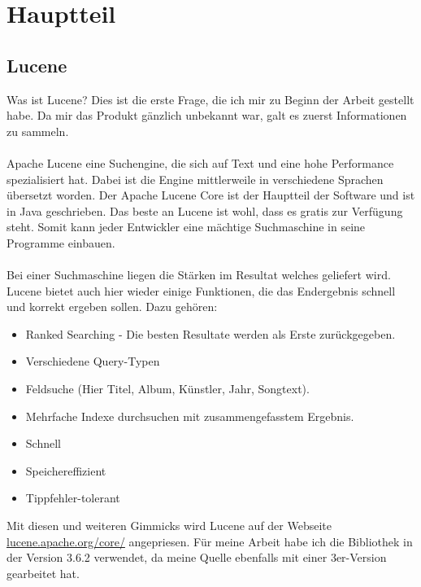 \documentclass[12pt,a4paper,ngerman]{report}
\begin{document}
\chapter{Hauptteil}
\section*{Lucene}
Was ist Lucene? Dies ist die erste Frage, die ich mir zu Beginn der Arbeit gestellt habe. Da mir das Produkt gänzlich unbekannt war, galt es zuerst Informationen zu sammeln.\\
\\
Apache Lucene eine Suchengine, die sich auf Text und eine hohe Performance spezialisiert hat. Dabei ist die Engine mittlerweile in verschiedene Sprachen übersetzt worden. Der Apache Lucene Core ist der Hauptteil der Software und ist in Java geschrieben. Das beste an Lucene ist wohl, dass es gratis zur Verfügung steht. Somit kann jeder Entwickler eine mächtige Suchmaschine in seine Programme einbauen. \\
\\
Bei einer Suchmaschine liegen die Stärken im Resultat welches geliefert wird. Lucene bietet auch hier wieder einige Funktionen, die das Endergebnis schnell und korrekt ergeben sollen. Dazu gehören:
\begin{itemize}
	\item Ranked Searching - Die besten Resultate werden als Erste zurückgegeben.
	\item Verschiedene Query-Typen
	\item Feldsuche (Hier Titel, Album, Künstler, Jahr, Songtext).
	\item Mehrfache Indexe durchsuchen mit zusammengefasstem Ergebnis.
	\item Schnell
	\item Speichereffizient
	\item Tippfehler-tolerant
\end{itemize}
Mit diesen und weiteren Gimmicks wird Lucene auf der Webseite \url{lucene.apache.org/core/} angepriesen. Für meine Arbeit habe ich die Bibliothek in der Version 3.6.2 verwendet, da meine Quelle ebenfalls mit einer 3er-Version gearbeitet hat.
\end{document}
